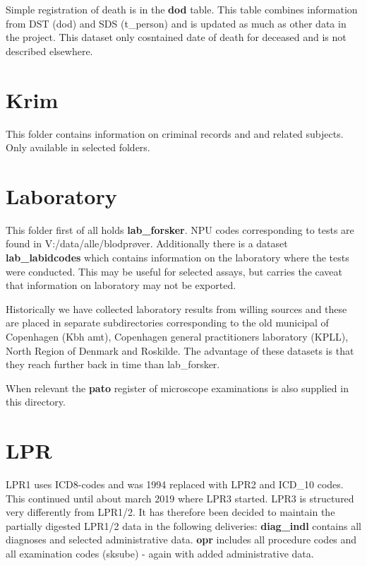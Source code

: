 \documentclass[
]{article}
\begin{document}
Simple registration of death is in the \textbf{dod} table. This table
combines information from DST (dod) and SDS (t\_person) and is updated
as much as other data in the project. This dataset only cosntained date
of death for deceased and is not described elsewhere.

\hypertarget{krim}{%
\section{Krim}\label{krim}}

This folder contains information on criminal records and and related
subjects. Only available in selected folders.

\hypertarget{laboratory}{%
\section{Laboratory}\label{laboratory}}

This folder first of all holds \textbf{lab\_forsker}. NPU codes
corresponding to tests are found in V:/data/alle/blodprøver.
Additionally there is a dataset \textbf{lab\_labidcodes} which contains
information on the laboratory where the tests were conducted. This may
be useful for selected assays, but carries the caveat that information
on laboratory may not be exported.

Historically we have collected laboratory results from willing sources
and these are placed in separate subdirectories corresponding to the old
municipal of Copenhagen (Kbh amt), Copenhagen general practitioners
laboratory (KPLL), North Region of Denmark and Roskilde. The advantage
of these datasets is that they reach further back in time than
lab\_forsker.

When relevant the \textbf{pato} register of microscope examinations is
also supplied in this directory.

\hypertarget{lpr}{%
\section{LPR}\label{lpr}}

LPR1 uses ICD8-codes and was 1994 replaced with LPR2 and ICD\_10 codes.
This continued until about march 2019 where LPR3 started. LPR3 is
structured very differently from LPR1/2. It has therefore been decided
to maintain the partially digested LPR1/2 data in the following
deliveries: \textbf{diag\_indl} contains all diagnoses and selected
administrative data. \textbf{opr} includes all procedure codes and all
examination codes (sksube) - again with added administrative data.
\end{document}
